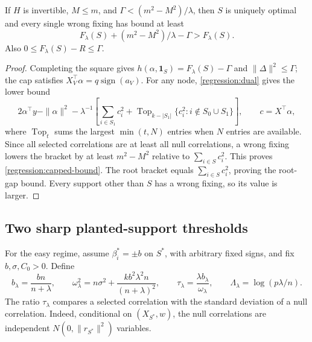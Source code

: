 \begin{lemma}
\label{regression:capped}
If $H$ is invertible, $M\leq m$, and
$\Gamma<(m^2-M^2)/\lambda$, then $S$ is uniquely optimal and every
single wrong fixing has bound at least
\begin{equation}\label{regression:capped-bound}
 F_\lambda(S)+(m^2-M^2)/\lambda-\Gamma>F_\lambda(S).
\end{equation}
Also $0\leq F_\lambda(S)-R\leq\Gamma$.
\end{lemma}
\begin{proof}
Completing the square gives
$h(\alpha,\mathbf1_S)=F_\lambda(S)-\Gamma$ and
$\|\Delta\|^2\leq\Gamma$; the cap satisfies
$X_V^\top\alpha=q\operatorname{sign}(a_V)$.
For any node, \eqref{regression:dual} gives the lower bound
\begin{equation}\label{regression:node-dual}
 2\alpha^\top y-\|\alpha\|^2-\lambda^{-1}
 \left[\sum_{i\in S_1}c_i^2+
 \operatorname{Top}_{k-|S_1|}\{c_i^2:i\notin S_0\cup S_1\}\right],
 \qquad c=X^\top\alpha,
\end{equation}
where $\operatorname{Top}_t$ sums the largest $\min(t,N)$ entries
when $N$ entries are available.
Since all selected correlations are at least all null correlations,
a wrong fixing lowers the bracket by at least $m^2-M^2$ relative to
$\sum_{i\in S}c_i^2$. This proves
\eqref{regression:capped-bound}. The root bracket equals
$\sum_{i\in S}c_i^2$, proving the root-gap bound. Every support other
than $S$ has a wrong fixing, so its value is larger.
\end{proof}

\subsection{Two sharp planted-support thresholds}
\label{regression:easy}

For the easy regime, assume $\beta_i^*=\pm b$ on $S^*$, with arbitrary
fixed signs, and fix $b,\sigma,C_0>0$. Define
\begin{equation}\label{regression:tau}
 b_\lambda=\frac{bn}{n+\lambda},\qquad
 \omega_\lambda^2=n\sigma^2+
             \frac{kb^2\lambda^2n}{(n+\lambda)^2},\qquad
 \tau_\lambda=\frac{\lambda b_\lambda}{\omega_\lambda},\qquad
 \Lambda_\lambda=\log(p\lambda/n).
\end{equation}
The ratio $\tau_\lambda$ compares a selected correlation with the
standard deviation of a null correlation. Indeed, conditional on
$(X_{S^*},w)$, the null correlations are independent
$N(0,\|r_{S^*}\|^2)$ variables.

